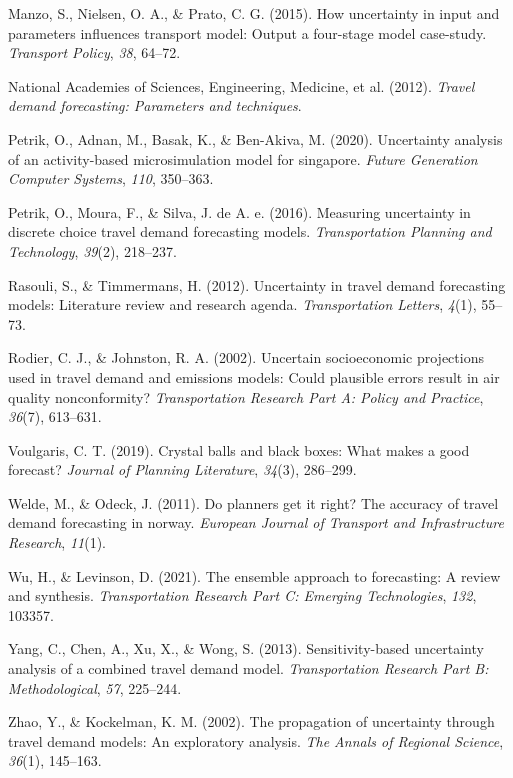 \documentclass[fancy, masters,twoside]{byuthesis}
\newlength{\cslhangindent}
\newlength{\cslentryspacingunit} %
\newenvironment{CSLReferences}[2] %
 {%
  \setlength{\parindent}{0pt}
  \ifodd #1
  \let\oldpar\par
  \def\par{\hangindent=\cslhangindent\oldpar}
  \fi
  \setlength{\parskip}{#2\cslentryspacingunit}
 }%
 {}
\begin{document}
\begin{CSLReferences}{1}{0}
\leavevmode{}%
Manzo, S., Nielsen, O. A., \& Prato, C. G. (2015). How uncertainty in input and parameters influences transport model: Output a four-stage model case-study. \emph{Transport Policy}, \emph{38}, 64--72.

\leavevmode{}%
National Academies of Sciences, Engineering, Medicine, et al. (2012). \emph{Travel demand forecasting: Parameters and techniques}.

\leavevmode{}%
Petrik, O., Adnan, M., Basak, K., \& Ben-Akiva, M. (2020). Uncertainty analysis of an activity-based microsimulation model for singapore. \emph{Future Generation Computer Systems}, \emph{110}, 350--363.

\leavevmode{}%
Petrik, O., Moura, F., \& Silva, J. de A. e. (2016). Measuring uncertainty in discrete choice travel demand forecasting models. \emph{Transportation Planning and Technology}, \emph{39}(2), 218--237.

\leavevmode{}%
Rasouli, S., \& Timmermans, H. (2012). Uncertainty in travel demand forecasting models: Literature review and research agenda. \emph{Transportation Letters}, \emph{4}(1), 55--73.

\leavevmode{}%
Rodier, C. J., \& Johnston, R. A. (2002). Uncertain socioeconomic projections used in travel demand and emissions models: Could plausible errors result in air quality nonconformity? \emph{Transportation Research Part A: Policy and Practice}, \emph{36}(7), 613--631.

\leavevmode{}%
Voulgaris, C. T. (2019). Crystal balls and black boxes: What makes a good forecast? \emph{Journal of Planning Literature}, \emph{34}(3), 286--299.

\leavevmode{}%
Welde, M., \& Odeck, J. (2011). Do planners get it right? The accuracy of travel demand forecasting in norway. \emph{European Journal of Transport and Infrastructure Research}, \emph{11}(1).

\leavevmode{}%
Wu, H., \& Levinson, D. (2021). The ensemble approach to forecasting: A review and synthesis. \emph{Transportation Research Part C: Emerging Technologies}, \emph{132}, 103357.

\leavevmode{}%
Yang, C., Chen, A., Xu, X., \& Wong, S. (2013). Sensitivity-based uncertainty analysis of a combined travel demand model. \emph{Transportation Research Part B: Methodological}, \emph{57}, 225--244.

\leavevmode{}%
Zhao, Y., \& Kockelman, K. M. (2002). The propagation of uncertainty through travel demand models: An exploratory analysis. \emph{The Annals of Regional Science}, \emph{36}(1), 145--163.

\end{CSLReferences}

\cleardoublepage
\pagestyle{byu}

%
\end{document}
